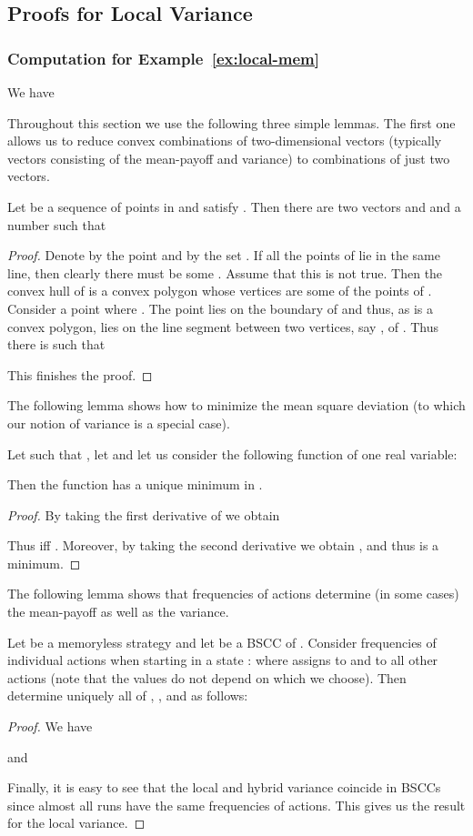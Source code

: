 \subsection{Proofs for Local Variance}
\label{app-local}
\subsubsection{Computation for Example~\ref{ex:local-mem}}\label{app:local-example}
We have


Throughout this section we use the following three simple lemmas. The first one allows us to reduce convex combinations of two-dimensional vectors (typically vectors consisting of the mean-payoff and variance) to combinations of just two vectors.
\begin{lemma}\label{lem:approx-two}
Let  be a sequence of points in  and  satisfy . Then there are two vectors  and  and a number  such that

\end{lemma}
\begin{proof}
Denote by  the point  and by  the set .
If all the points of  lie in the same line, then clearly there must be some .
Assume that this is not true. Then the convex hull  of  is a convex polygon whose vertices are some of the points of . Consider a point  where . The point  lies on the boundary of  and thus, as  is a convex polygon,  lies on the line segment between two vertices, say , of . Thus there is  such that

This finishes the proof.
\end{proof}
\noindent
The following lemma shows how to minimize the mean square deviation (to which our notion of variance is a special case).
\begin{lemma}\label{lem:min-var}
Let  such that , let  and let us consider the following function of one real variable:

Then the function  has a unique minimum in .
\end{lemma}
\begin{proof}
By taking the first derivative of  we obtain

Thus  iff .
Moreover, by taking the second derivative we obtain , and thus  is a minimum.
\end{proof}
The following lemma shows that frequencies of actions determine (in some cases) the mean-payoff as well as the variance.
\begin{lemma}\label{lem:freq-var}
Let  be a memoryless strategy and let  be a BSCC of . Consider frequencies of individual actions  when starting in a state :  where  assigns  to  and  to all other actions (note that the values do not depend on which  we choose).
Then  determine uniquely all of , , and  as follows: 

\end{lemma}
\begin{proof}
We have

and

Finally, it is easy to see that the local and hybrid variance coincide in BSCCs since almost all runs have the same frequencies of actions. This gives us the result for the local variance.
\end{proof}

